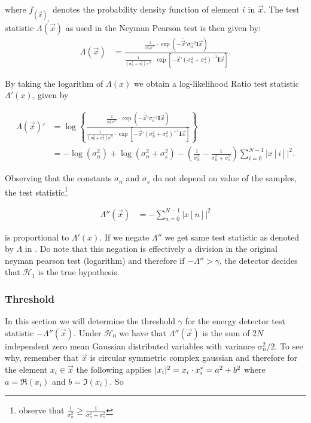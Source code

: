 \documentclass[a4paper, openany, oneside]{memoir}
\begin{document}
where $f_{(\vec{x})_i}$ denotes the probability density function of element $i$ in $\vec{x}$.  The test statistic $\Lambda(\vec{x})$ as used in the Neyman Pearson test is then given by:
\begin{align*}
\Lambda(\vec{x}) &=\frac{\frac{1}{\sigma_n^2\pi^N} \cdot \exp(-\bar{\vec{x}}'\sigma_n^{-2}\mathbf{I}\vec{x})}{\frac{1}{(\sigma_n^2 + \sigma_s^2)\pi^N} \cdot \exp[-\bar{\vec{x}}'(\sigma_n^2+\sigma_s^2)^{-1}\mathbf{I}\vec{x}]}.
\end{align*}


By taking the logarithm of $\Lambda(x)$ we obtain a log-likelihood Ratio test statistic $\Lambda'(x)$, given by

\begin{align}
\Lambda(\vec{x})' &= \log \left\{
\frac{\frac{1}{\sigma_n^2\pi^N} \cdot \exp(-\bar{\vec{x}}'\sigma_n^{-2}\mathbf{I}\vec{x})}{\frac{1}{(\sigma_n^2 + \sigma_s^2)\pi^N} \cdot \exp[-\bar{\vec{x}}'(\sigma_n^2+\sigma_s^2)^{-1}\mathbf{I}\vec{x}]}\right\} \\
&= -\log(\sigma_n^2) + \log(\sigma_n^2 + \sigma_s^2) -(\frac{1}{\sigma_n^2} - \frac{1}{\sigma_n^2 + \sigma_s^2 })\sum_{i=0}^{N-1} |x[i]|^2.  \nonumber
\end{align}

Observing that the constants $\sigma_n$ and $\sigma_s$ do not depend on value of the samples, the test statistic\footnote{observe that $\frac{1}{\sigma_n^2} \geq \frac{1}{\sigma_n^2+\sigma_s^2}$}

\begin{align*}
\Lambda''(\vec{x}) &= -\sum_{n=0}^{N-1} |x[n]|^2
\end{align*} 

is proportional to $\Lambda'(x)$. If we negate $\Lambda''$ we get same test statistic as denoted by $\Lambda$ in . Do note that
this negation is effectively a division in the original neyman pearson test (logarithm) and therefore if
$-\Lambda'' > \gamma$, the detector decides that $\mathcal{H}_1$ is the true hypothesis. 

\subsubsection{Threshold}
In this section we will determine the threshold $\gamma$ for the energy detector test statistic $-\Lambda''(\vec{x})$.
Under $\mathcal{H}_0$ we have that $\Lambda''(\vec{x})$ is the sum of $2N$ independent zero mean Gaussian distributed variables
with variance $\sigma_n^2/2$. To see why, remember that $\vec{x}$ is circular symmetric complex gaussian and therefore for the element $x_i \in \vec{x}$ the following applies
$|x_i|^2 = x_i \cdot x_i^* = a^2 + b^2$ where $a = \Re(x_i)$ and $b=\Im(x_i)$.  So
\end{document}
